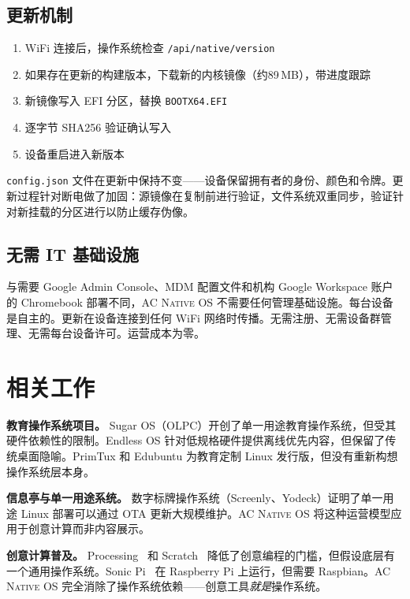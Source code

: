 \documentclass[10pt,letterpaper,twocolumn]{article}
\newcommand{\acos}{\textsc{AC Native OS}}
\begin{document}
\subsection{更新机制}

\begin{enumerate}
  \item WiFi 连接后，操作系统检查 \texttt{/api/native/version}
  \item 如果存在更新的构建版本，下载新的内核镜像（约89\,MB），带进度跟踪
  \item 新镜像写入 EFI 分区，替换 \texttt{BOOTX64.EFI}
  \item 逐字节 SHA256 验证确认写入
  \item 设备重启进入新版本
\end{enumerate}

\texttt{config.json} 文件在更新中保持不变——设备保留拥有者的身份、颜色和令牌。更新过程针对断电做了加固：源镜像在复制前进行验证，文件系统双重同步，验证针对新挂载的分区进行以防止缓存伪像。

\subsection{无需 IT 基础设施}

与需要 Google Admin Console、MDM 配置文件和机构 Google Workspace 账户的 Chromebook 部署不同，\acos{} 不需要任何管理基础设施。每台设备是自主的。更新在设备连接到任何 WiFi 网络时传播。无需注册、无需设备群管理、无需每台设备许可。运营成本为零。


\section{相关工作}
\label{sec:related}

\textbf{教育操作系统项目。} Sugar OS（OLPC）开创了单一用途教育操作系统，但受其硬件依赖性的限制。Endless OS 针对低规格硬件提供离线优先内容，但保留了传统桌面隐喻。PrimTux 和 Edubuntu 为教育定制 Linux 发行版，但没有重新构想操作系统层本身。

\textbf{信息亭与单一用途系统。} 数字标牌操作系统（Screenly、Yodeck）证明了单一用途 Linux 部署可以通过 OTA 更新大规模维护。\acos{} 将这种运营模型应用于创意计算而非内容展示。

\textbf{创意计算普及。} Processing~\citep{reas2007processing} 和 Scratch~\citep{resnick2009scratch} 降低了创意编程的门槛，但假设底层有一个通用操作系统。Sonic Pi~\citep{aaron2016sonic} 在 Raspberry Pi 上运行，但需要 Raspbian。\acos{} 完全消除了操作系统依赖——创意工具\emph{就是}操作系统。
\end{document}

